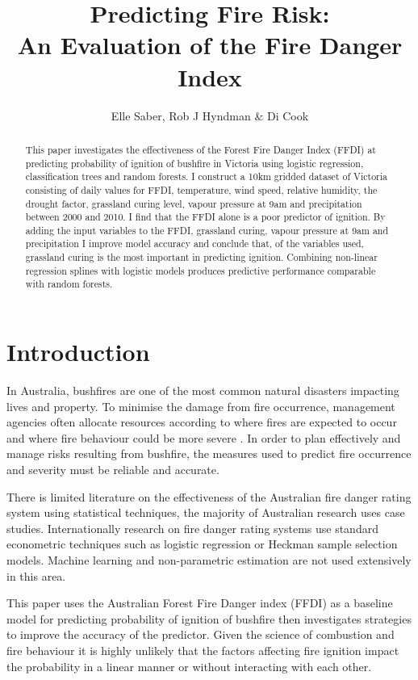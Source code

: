 \documentclass[11pt,a4paper]{article}
\title{Predicting Fire Risk: \\ An Evaluation of the Fire Danger Index}
\author{Elle Saber, Rob J Hyndman \& Di Cook}
\begin{document}
\maketitle

\begin{abstract}
  This paper investigates the effectiveness of the Forest Fire Danger Index (FFDI) \citep{mcarthur67} at predicting probability of ignition of bushfire in Victoria using logistic regression, classification trees and random forests. I construct a 10km gridded dataset of Victoria consisting of daily values for FFDI, temperature, wind speed, relative humidity, the drought factor, grassland curing level, vapour pressure at 9am and precipitation between 2000 and 2010. I find that the FFDI alone is a poor predictor of ignition. By adding the input variables to the FFDI, grassland curing, vapour pressure at 9am and precipitation I improve model accuracy and conclude that, of the variables used, grassland curing is the most important in predicting ignition. Combining non-linear regression splines with logistic models produces predictive performance comparable with random forests.
\end{abstract}

\section{Introduction}

In Australia, bushfires are one of the most common natural disasters impacting lives and property. To minimise the damage from fire occurrence, management agencies often allocate resources according to where fires are expected to occur and where fire behaviour could be more severe  \citep{padilla11, wotton05}. In order to plan effectively and manage risks resulting from bushfire, the measures used to predict fire occurrence and severity must be reliable and accurate.

There is limited literature on the effectiveness of the Australian fire danger rating system using statistical techniques, the majority of Australian research uses case studies. Internationally research on fire danger rating systems use standard econometric techniques such as logistic regression or Heckman sample selection models. Machine learning and non-parametric estimation are not used extensively in this area.

This paper uses the Australian Forest Fire Danger index (FFDI) as a baseline model for predicting probability of ignition of bushfire then investigates strategies to improve the accuracy of the predictor. Given the science of combustion and fire behaviour it is highly unlikely that the factors affecting fire ignition impact the probability in a linear manner or without interacting with each other.
\end{document}
